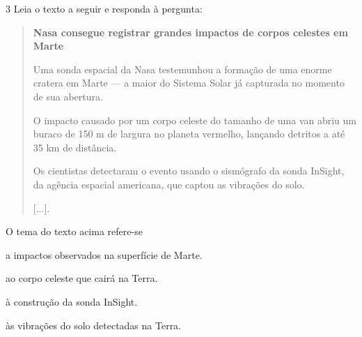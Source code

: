 
\num{3} Leia o texto a seguir e responda à pergunta:

\begin{quote}
\textbf{Nasa consegue registrar grandes impactos de corpos celestes em Marte}

Uma sonda espacial da Nasa testemunhou a formação de uma enorme
cratera em Marte --- a maior do Sistema Solar já capturada no momento de
sua abertura.

O impacto causado por um corpo celeste do tamanho de uma van abriu um
buraco de 150 m de largura no planeta vermelho, lançando detritos a até
35 km de distância.

Os cientistas detectaram o evento usando o sismógrafo da sonda InSight,
da agência espacial americana, que captou as vibrações do solo.

{[}...{]}.

\end{quote}

O tema do texto acima refere-se

\begin{escolha}
\item a impactos observados na superfície de Marte.

\item ao corpo celeste que cairá na Terra.

\item à construção da sonda InSight.

\item às vibrações do solo detectadas na Terra.
\end{escolha}

